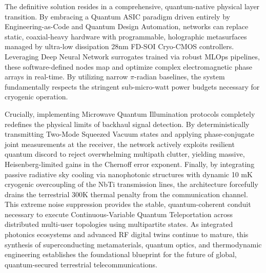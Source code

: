 \documentclass[11pt,a4paper]{article}
\begin{document}
The definitive solution resides in a comprehensive, quantum-native physical layer transition. By embracing a Quantum ASIC paradigm driven entirely by Engineering-as-Code and Quantum Design Automation, networks can replace static, coaxial-heavy hardware with programmable, holographic metasurfaces managed by ultra-low dissipation 28nm FD-SOI Cryo-CMOS controllers. Leveraging Deep Neural Network surrogates trained via robust MLOps pipelines, these software-defined nodes map and optimize complex electromagnetic phase arrays in real-time. By utilizing narrow $\pi$-radian baselines, the system fundamentally respects the stringent sub-micro-watt power budgets necessary for cryogenic operation.

Crucially, implementing Microwave Quantum Illumination protocols completely redefines the physical limits of backhaul signal detection. By deterministically transmitting Two-Mode Squeezed Vacuum states and applying phase-conjugate joint measurements at the receiver, the network actively exploits resilient quantum discord to reject overwhelming multipath clutter, yielding massive, Heisenberg-limited gains in the Chernoff error exponent. Finally, by integrating passive radiative sky cooling via nanophotonic structures with dynamic 10 mK cryogenic overcoupling of the NbTi transmission lines, the architecture forcefully drains the terrestrial 300K thermal penalty from the communication channel. This extreme noise suppression provides the stable, quantum-coherent conduit necessary to execute Continuous-Variable Quantum Teleportation across distributed multi-user topologies using multipartite states. As integrated photonics ecosystems and advanced RF digital twins continue to mature, this synthesis of superconducting metamaterials, quantum optics, and thermodynamic engineering establishes the foundational blueprint for the future of global, quantum-secured terrestrial telecommunications.
\end{document}

